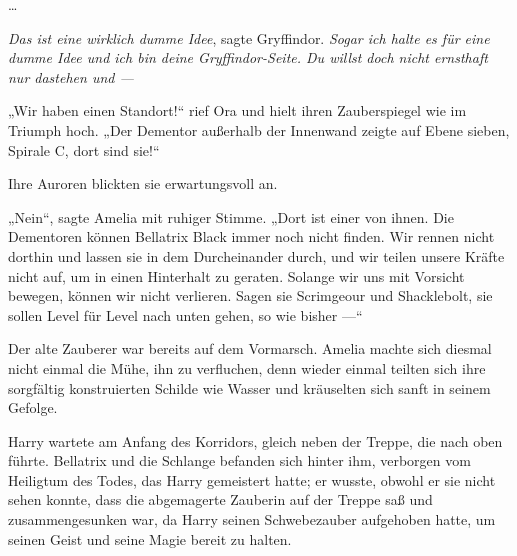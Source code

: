…

\emph{Das ist eine wirklich dumme Idee}, sagte Gryffindor. \emph{Sogar ich halte es für eine dumme Idee und ich bin deine Gryffindor-Seite. Du willst doch nicht ernsthaft nur dastehen und —}

\later

„Wir haben einen Standort!“ rief Ora und hielt ihren Zauberspiegel wie im Triumph hoch.
„Der Dementor außerhalb der Innenwand zeigte auf Ebene sieben, Spirale C, dort sind sie!“

Ihre Auroren blickten sie erwartungsvoll an.

„Nein“, sagte Amelia mit ruhiger Stimme.
„Dort ist einer von ihnen. Die Dementoren können Bellatrix Black immer noch nicht finden. Wir rennen nicht dorthin und lassen sie in dem Durcheinander durch, und wir teilen unsere Kräfte nicht auf, um in einen Hinterhalt zu geraten. Solange wir uns mit Vorsicht bewegen, können wir nicht verlieren. Sagen sie Scrimgeour und Shacklebolt, sie sollen Level für Level nach unten gehen, so wie bisher —“

Der alte Zauberer war bereits auf dem Vormarsch. Amelia machte sich diesmal nicht einmal die Mühe, ihn zu verfluchen, denn wieder einmal teilten sich ihre sorgfältig konstruierten Schilde wie Wasser und kräuselten sich sanft in seinem Gefolge.

\later

Harry wartete am Anfang des Korridors, gleich neben der Treppe, die nach oben führte. Bellatrix und die Schlange befanden sich hinter ihm, verborgen vom Heiligtum des Todes, das Harry gemeistert hatte; er wusste, obwohl er sie nicht sehen konnte, dass die abgemagerte Zauberin auf der Treppe saß und zusammengesunken war, da Harry seinen Schwebezauber aufgehoben hatte, um seinen Geist und seine Magie bereit zu halten.

